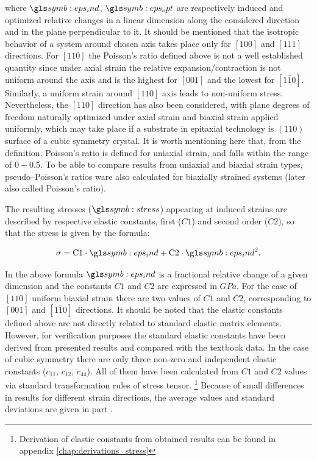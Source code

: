 where $\epsind$, $\epsopt$ are respectively induced and optimized relative changes in a linear dimension along the considered direction and in the plane perpendicular to it. It should be mentioned that the isotropic behavior of a system around chosen axis takes place only for $[100]$ and $[111]$ directions.
For $[110]$ the Poisson's ratio defined above is not a well established quantity since under axial strain the relative expansion/contraction is not uniform around the axis and is the highest for $[001]$  and the lowest for $[1\bar{1}0]$.
Similarly, a uniform strain around $[110]$ axis leads to non-uniform stress.
Nevertheless, the $[110]$ direction has also been considered, with plane degrees of freedom naturally optimized under axial strain and biaxial strain applied uniformly, which may take place if a substrate in epitaxial technology is $(110)$ surface of a cubic symmetry crystal.
It is worth mentioning here that, from the definition, Poisson's ratio is defined for uniaxial strain, and falls within the range of $0-0.5$.
To be able to compare results from uniaxial and biaxial strain types, pseudo--Poisson's ratios ware also calculated for biaxially strained systems (later also called Poisson's ratio).

The resulting stresses ($\stress$) appearing at induced strains are described by respective elastic constants, first ($C1$) and second order ($C2$), so that the stress is given by the formula:

\begin{equation}
\label{Eq:stress}
\sigma=\text{C1}\cdot \epsind+\text{C2}\cdot \epsind^2.
\end{equation}

In the above formula $\epsind$ is a fractional relative change of a given dimension and the constants $C1$ and $C2$ are expressed in $GPa$. For the case of $[110]$ uniform biaxial strain there are two values of $C1$ and $C2$, corresponding to $[001]$ and $[1\bar{1}0]$ directions.
It should be noted that the elastic constants defined above are not directly related to standard elastic matrix elements.
However, for verification purposes the standard elastic constants have been derived from presented results and compared with the textbook data.
In the case of cubic symmetry there are only three non-zero and independent elastic constants ($c_{11}$, $c_{12}$, $c_{44}$).
All of them have been calculated from $C1$ and $C2$ values via standard transformation rules of stress tensor.
\footnote{Derivation of elastic constants from obtained results can be found in appendix \ref{chap:derivations_stress}}
Because of small differences in results for different strain directions, the average values and standard deviations are given in part \hyperref[part:III]{}.

